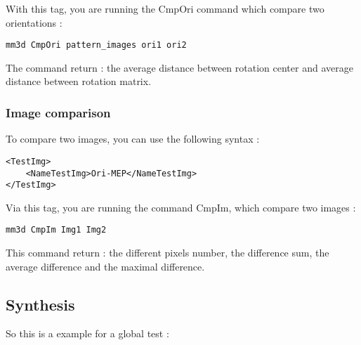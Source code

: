 \documentclass[a4paper]{book}
\begin{document}
With this tag, you are running the CmpOri command which compare two orientations :
\begin{verbatim}
mm3d CmpOri pattern_images ori1 ori2
\end{verbatim}
The command return : the average distance between rotation center and average distance between rotation matrix.

\subsubsection{Image comparison}
To compare two images, you can use the following syntax :

\begin{lstlisting}
<TestImg> 
	<NameTestImg>Ori-MEP</NameTestImg>
</TestImg>
\end{lstlisting}

Via this tag, you are running the command CmpIm, which compare two images :
\begin{verbatim}
mm3d CmpIm Img1 Img2
\end{verbatim}
This command return : the different pixels number, the difference sum, the average difference and the maximal difference.

\subsection{Synthesis}
So this is a example for a global test :
\end{document}
